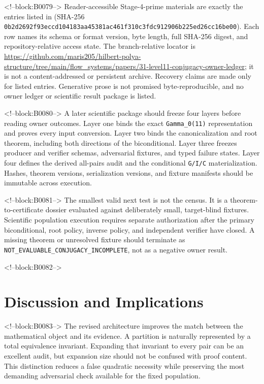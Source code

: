\documentclass[11pt]{article}
\begin{document}
<!--block:B0079-->
\begingroup\sloppy
Reader-accessible Stage-4-prime materials are exactly the entries listed in
 (SHA-256
\texttt{0b2d2692f93eccd1\allowbreak{}04183aa45381ac46\allowbreak{}1f310c3fdc912906\allowbreak{}b225ed26cc16be00}).  Each row names its schema or format version, byte
length, full SHA-256 digest, and repository-relative access state.  The
branch-relative locator is
\url{https://github.com/maris205/hilbert-polya-structure/tree/main/flow_systems/papers/31-level11-conjugacy-owner-ledger};
it is not a content-addressed or persistent archive.  Recovery claims are made
only for listed entries.  Generative prose is not promised byte-reproducible,
and no owner ledger or scientific result package is listed.
\par\endgroup

<!--block:B0080-->
A later scientific package should freeze four layers before reading
owner outcomes. Layer one binds the exact \texttt{Gamma\_0(11)}
representation and proves every input conversion. Layer two binds the
canonicalization and root theorem, including both directions of the
biconditional. Layer three freezes producer and verifier schemas,
adversarial fixtures, and typed failure states. Layer four defines the
derived all-pairs audit and the conditional \texttt{G/I/C}
materialization. Hashes, theorem versions, serialization versions, and
fixture manifests should be immutable across execution.

<!--block:B0081-->
The smallest valid next test is not the census. It is a
theorem-to-certificate dossier evaluated against deliberately small,
target-blind fixtures. Scientific population execution requires separate
authorization after the primary biconditional, root policy, inverse
policy, and independent verifier have closed. A missing theorem or
unresolved fixture should terminate as
\texttt{NOT\_EVALUABLE\_CONJUGACY\_INCOMPLETE}, not as a negative owner
result.

<!--block:B0082-->
\hypertarget{7-discussion-and-implications}{%
\section{Discussion and
Implications}\label{7-discussion-and-implications}}

<!--block:B0083-->
The revised architecture improves the match between the mathematical
object and its evidence. A partition is naturally represented by a total
equivalence invariant. Expanding that invariant to every pair can be an
excellent audit, but expansion size should not be confused with proof
content. This distinction reduces a false quadratic necessity while
preserving the most demanding adversarial check available for the fixed
population.
\end{document}
